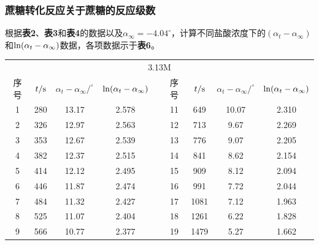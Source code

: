 \documentclass[12pt]{article}
\begin{document}
			\subsubsection{蔗糖转化反应关于蔗糖的反应级数}
			根据\textbf{表2}、\textbf{表3}和\textbf{表4}的数据以及$\alpha_{\infty}=-4.04^{\circ}$，计算不同盐酸浓度下的$(\alpha_{t}-\alpha_{\infty})$和${\rm ln}(\alpha_{t}-\alpha_{\infty})$数据，各项数据示于\textbf{表6}。\par
			\begin{table}[!h]
				\centering
				\begin{tabular}{ccccccccc}
					\toprule
					\multicolumn{9}{c}{3.13M}																							   \\
					序号 & $t/{\rm s}$ & $\alpha_{t}-\alpha_{\infty}/ ^{\circ}$ & ${\rm ln}(\alpha_{t}-\alpha_{\infty})$ &  & 序号 & $t/{\rm s}$ & $\alpha_{t}-\alpha_{\infty}/ ^{\circ}$ & ${\rm ln}(\alpha_{t}-\alpha_{\infty})$ \\
					\midrule
					1  & 280           & 13.17               & 2.578   &  & 11 & 649           & 10.07               & 2.310   \\
					2  & 326           & 12.97               & 2.563   &  & 12 & 713           & 9.67                & 2.269   \\
					3  & 353           & 12.67               & 2.539   &  & 13 & 776           & 9.07                & 2.205   \\
					4  & 382           & 12.37               & 2.515   &  & 14 & 841           & 8.62                & 2.154   \\
					5  & 414           & 12.12               & 2.495   &  & 15 & 909           & 8.12                & 2.094   \\
					6  & 446           & 11.87               & 2.474   &  & 16 & 991           & 7.72                & 2.044   \\
					7  & 484           & 11.32               & 2.427   &  & 17 & 1081          & 7.12                & 1.963   \\
					8  & 525           & 11.07               & 2.404   &  & 18 & 1261          & 6.22                & 1.828   \\
					9  & 566           & 10.77               & 2.377   &  & 19 & 1479          & 5.27                & 1.662   \\

\end{tabular}
\end{table}
\end{document}
